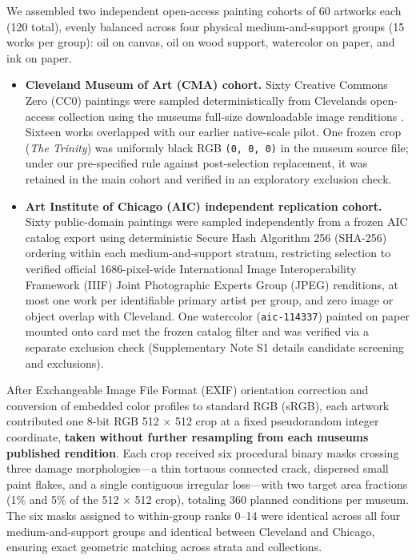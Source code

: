 \documentclass[applsci,article,submit,pdftex,moreauthors]{Definitions/mdpi}
\providecommand{\tightlist}{\setlength{\itemsep}{0pt}\setlength{\parskip}{0pt}}
\begin{document}
We assembled two independent open-access painting cohorts of 60 artworks each (120 total), evenly balanced across four physical medium-and-support groups (15 works per group): oil on canvas, oil on wood support, watercolor on paper, and ink on paper.

\begin{itemize}
\tightlist
\item
  \textbf{Cleveland Museum of Art (CMA) cohort.} Sixty Creative Commons Zero (CC0) paintings were sampled deterministically from Cleveland\textquotesingle s open-access collection using the museum\textquotesingle s full-size downloadable image renditions \citep{cma-openaccess}. Sixteen works overlapped with our earlier native-scale pilot. One frozen crop (\emph{The Trinity}) was uniformly black RGB \texttt{(0,\ 0,\ 0)} in the museum source file; under our pre-specified rule against post-selection replacement, it was retained in the main cohort and verified in an exploratory exclusion check.
\item
  \textbf{Art Institute of Chicago (AIC) independent replication cohort.} Sixty public-domain paintings were sampled independently from a frozen AIC catalog export \citep{aic-openaccess} using deterministic Secure Hash Algorithm 256 (SHA-256) ordering within each medium-and-support stratum, restricting selection to verified official 1686-pixel-wide International Image Interoperability Framework (IIIF) Joint Photographic Experts Group (JPEG) renditions, at most one work per identifiable primary artist per group, and zero image or object overlap with Cleveland. One watercolor (\texttt{aic-114337}) painted on paper mounted onto card met the frozen catalog filter and was verified via a separate exclusion check (Supplementary Note S1 details candidate screening and exclusions).
\end{itemize}

After Exchangeable Image File Format (EXIF) orientation correction and conversion of embedded color profiles to standard RGB (sRGB), each artwork contributed one 8-bit RGB 512 \ensuremath{\times} 512 crop at a fixed pseudorandom integer coordinate, \textbf{taken without further resampling from each museum\textquotesingle s published rendition}. Each crop received six procedural binary masks crossing three damage morphologies---a thin tortuous connected crack, dispersed small paint flakes, and a single contiguous irregular loss---with two target area fractions (1\% and 5\% of the 512 \ensuremath{\times} 512 crop), totaling 360 planned conditions per museum. The six masks assigned to within-group ranks 0--14 were identical across all four medium-and-support groups and identical between Cleveland and Chicago, ensuring exact geometric matching across strata and collections.
\end{document}
